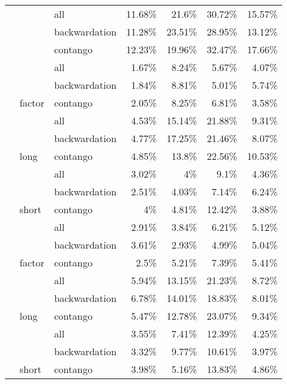 \documentclass[]{elsarticle} %
\begin{document}
\begin{longtable}[t]{>{}lllrrrr}
\endfoot
\bottomrule
\endlastfoot
 &  & all & 11.68\% & 21.6\% & 30.72\% & 15.57\%\\
\nopagebreak
 &  & backwardation & 11.28\% & 23.51\% & 28.95\% & 13.12\%\\
\nopagebreak
\multirow[t]{-3}{*}{\raggedright\arraybackslash \textbf{market}} &  & contango & 12.23\% & 19.96\% & 32.47\% & 17.66\%\\
\nopagebreak
 &  & all & 1.67\% & 8.24\% & 5.67\% & 4.07\%\\
\nopagebreak
 &  & backwardation & 1.84\% & 8.81\% & 5.01\% & 5.74\%\\
\nopagebreak
 & \multirow[t]{-6}{*}{\raggedright\arraybackslash factor} & contango & 2.05\% & 8.25\% & 6.81\% & 3.58\%\\
\nopagebreak
 &  & all & 4.53\% & 15.14\% & 21.88\% & 9.31\%\\
\nopagebreak
 &  & backwardation & 4.77\% & 17.25\% & 21.46\% & 8.07\%\\
\nopagebreak
 & \multirow[t]{-3}{*}{\raggedright\arraybackslash long} & contango & 4.85\% & 13.8\% & 22.56\% & 10.53\%\\
\nopagebreak
 &  & all & 3.02\% & 4\% & 9.1\% & 4.36\%\\
\nopagebreak
 &  & backwardation & 2.51\% & 4.03\% & 7.14\% & 6.24\%\\
\nopagebreak
\multirow[t]{-9}{*}{\raggedright\arraybackslash \textbf{CHP}} & \multirow[t]{-3}{*}{\raggedright\arraybackslash short} & contango & 4\% & 4.81\% & 12.42\% & 3.88\%\\
\cmidrule{1-7}\pagebreak[0]
 &  & all & 2.91\% & 3.84\% & 6.21\% & 5.12\%\\
\nopagebreak
 &  & backwardation & 3.61\% & 2.93\% & 4.99\% & 5.04\%\\
\nopagebreak
 & \multirow[t]{-3}{*}{\raggedright\arraybackslash factor} & contango & 2.5\% & 5.21\% & 7.39\% & 5.41\%\\
\nopagebreak
 &  & all & 5.94\% & 13.15\% & 21.23\% & 8.72\%\\
\nopagebreak
 &  & backwardation & 6.78\% & 14.01\% & 18.83\% & 8.01\%\\
\nopagebreak
 & \multirow[t]{-3}{*}{\raggedright\arraybackslash long} & contango & 5.47\% & 12.78\% & 23.07\% & 9.34\%\\
\nopagebreak
 &  & all & 3.55\% & 7.41\% & 12.39\% & 4.25\%\\
\nopagebreak
 &  & backwardation & 3.32\% & 9.77\% & 10.61\% & 3.97\%\\
\nopagebreak
\multirow[t]{-9}{*}{\raggedright\arraybackslash \textbf{open interest}} & \multirow[t]{-3}{*}{\raggedright\arraybackslash short} & contango & 3.98\% & 5.16\% & 13.83\% & 4.86\%\\

\end{longtable}
\end{document}
